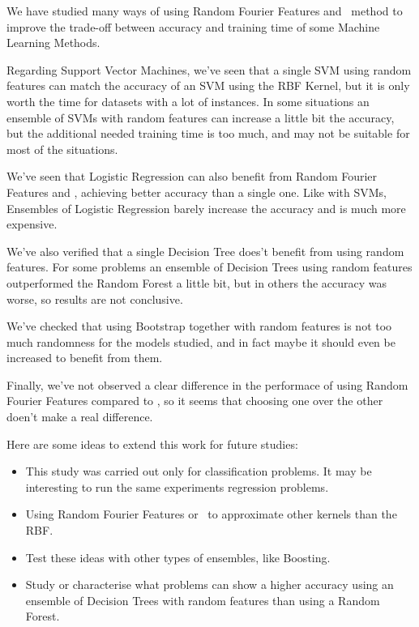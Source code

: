 \begin{pre-delivery}
  We have studied many ways of using Random Fourier Features and \Nys\ method
  to improve the trade-off between accuracy and training time of some
  Machine Learning Methods.

  Regarding Support Vector Machines, we've seen that a single SVM using
  random features can match the accuracy of an SVM using the RBF Kernel, but
  it is only worth the time for datasets with a lot of instances. In some
  situations an ensemble of SVMs with random features can increase a little
  bit the accuracy, but the additional needed training time is too much, and
  may not be suitable for most of the situations.

  We've seen that Logistic Regression can also benefit from Random Fourier
  Features and \Nys, achieving better accuracy than a single one. Like with
  SVMs, Ensembles of Logistic Regression barely increase the accuracy and
  is much more expensive.

  We've also verified that a single Decision Tree does't benefit from using
  random features. For some problems an ensemble of Decision Trees using
  random features outperformed the Random Forest a little bit, but in others
  the accuracy was worse, so results are not conclusive.

  We've checked that using Bootstrap together with random features is not
  too much randomness for the models studied, and in fact maybe it should
  even be increased to benefit from them.

  Finally, we've not observed a clear difference in the performace of using
  Random Fourier Features compared to \Nys, so it seems that choosing one over
  the other doen't make a real difference.

  Here are some ideas to extend this work for future studies:
  \begin{itemize}
    \item This study was carried out only for classification problems. It may be
    interesting to run the same experiments regression problems.
    \item Using Random Fourier Features or \Nys\ to approximate other kernels
    than the RBF.
    \item Test these ideas with other types of ensembles, like Boosting.
    \item Study or characterise what problems can show a higher accuracy
    using an ensemble of Decision Trees with random features than
    using a Random Forest.
  \end{itemize}
\end{pre-delivery}
